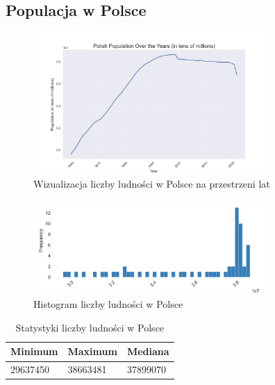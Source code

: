 \documentclass[11pt]{article}
\begin{document}
\subsection{Populacja w Polsce}
\begin{figure}[H]
        \centering
        \includegraphics[width=0.8\textwidth]{polish_population_over_the_years.png}
        \caption{Wizualizacja liczby ludności w Polsce na przestrzeni lat}
\end{figure}
\begin{figure}[H]
        \centering
        \includegraphics[width=0.8\textwidth]{images/histogram_populacja.png}
        \caption{Histogram liczby ludności w Polsce}
\end{figure}
\begin{table}[H]
        \centering
        \begin{tabular}{|l|l|l|}
        \hline
        Minimum & Maximum & Mediana \\ \hline
        29637450 & 38663481 & 37899070 \\ \hline
        \end{tabular}
        \caption{Statystyki liczby ludności w Polsce}
        \end{table}
\end{document}
